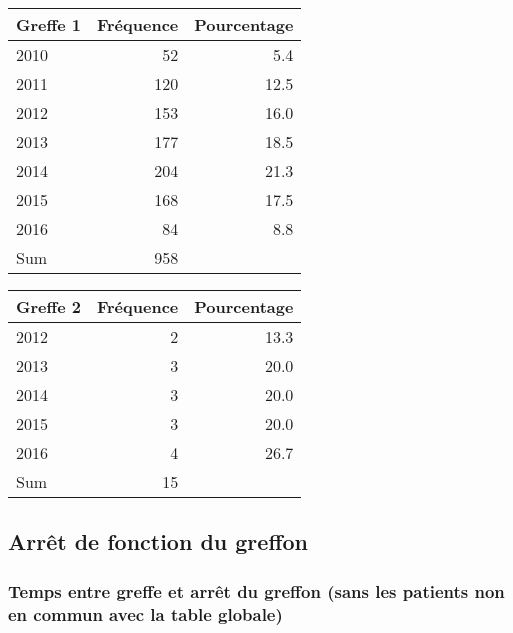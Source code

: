 \documentclass[11pt,a4paper]{article}\usepackage[]{graphicx}\usepackage[]{color}
\begin{document}
\begin{multicols}{2}
\begin{table}[H]
\centering
\begin{tabular}{lrr}
  \hline
Greffe 1 & Fréquence & Pourcentage \\ 
  \hline
2010 & 52 & 5.4 \\ 
  2011 & 120 & 12.5 \\ 
  2012 & 153 & 16.0 \\ 
  2013 & 177 & 18.5 \\ 
  2014 & 204 & 21.3 \\ 
  2015 & 168 & 17.5 \\ 
  2016 & 84 & 8.8 \\ 
  Sum & 958 &  \\ 
   \hline
\end{tabular}
\end{table}
\begin{table}[H]
\centering
\begin{tabular}{lrr}
  \hline
Greffe 2 & Fréquence & Pourcentage \\ 
  \hline
2012 &  2 & 13.3 \\ 
  2013 &  3 & 20.0 \\ 
  2014 &  3 & 20.0 \\ 
  2015 &  3 & 20.0 \\ 
  2016 &  4 & 26.7 \\ 
  Sum & 15 &  \\ 
   \hline
\end{tabular}
\end{table}

\end{multicols}

  \subsection{Arrêt de fonction du greffon}

    \subsubsection{Temps entre greffe et arrêt du greffon (sans les patients non en commun avec la table globale)}
\end{document}

